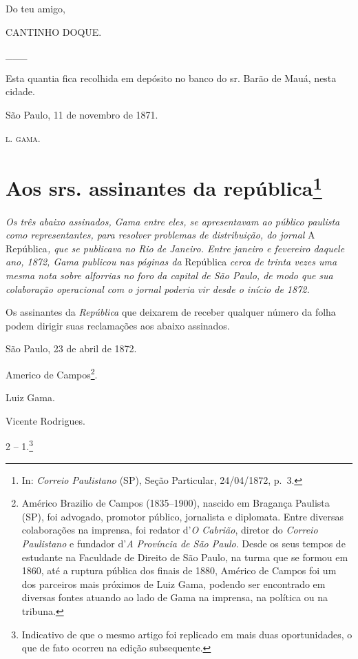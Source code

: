 Do teu amigo,

CANTINHO DOQUE.

\_\_\_

Esta quantia fica recolhida em depósito no banco do sr. Barão de Mauá,
nesta cidade.

São Paulo, 11 de novembro de 1871.

\textsc{l. gama}.

\chapter{Aos srs. assinantes da república\footnote{ In: \emph{Correio Paulistano} (SP), Seção Particular,
  24/04/1872, p.~3.}} %

\begin{didascalia}
\emph{Os três abaixo assinados, Gama entre eles, se apresentavam ao
público paulista como representantes, para resolver problemas de
distribuição, do jornal} A República\emph{, que se publicava no Rio de
Janeiro. Entre janeiro e fevereiro daquele ano, 1872, Gama publicou nas
páginas da} República \emph{cerca de trinta vezes uma mesma nota sobre
alforrias no foro da capital de São Paulo, de modo que sua colaboração
operacional com o jornal poderia vir desde o início de 1872.}
\end{didascalia}

\asterisc{}

Os assinantes da \emph{República} que deixarem de receber qualquer
número da folha podem dirigir suas reclamações aos abaixo assinados.

São Paulo, 23 de abril de 1872.

Americo de Campos\footnote{ Américo Brazilio de Campos (1835--1900),
  nascido em Bragança Paulista (SP), foi advogado, promotor público,
  jornalista e diplomata. Entre diversas colaborações na imprensa, foi
  redator d'\emph{O Cabrião}, diretor do \emph{Correio Paulistano} e
  fundador d'\emph{A Província de São Paulo}. Desde os seus tempos de
  estudante na Faculdade de Direito de São Paulo, na turma que se formou
  em 1860, até a ruptura pública dos finais de 1880, Américo de Campos
  foi um dos parceiros mais próximos de Luiz Gama, podendo ser
  encontrado em diversas fontes atuando ao lado de Gama na imprensa, na
  política ou na tribuna.}.

Luiz Gama.

Vicente Rodrigues.

2 -- 1.\footnote{ Indicativo de que o mesmo artigo foi replicado em
  mais duas oportunidades, o que de fato ocorreu na edição subsequente.}


